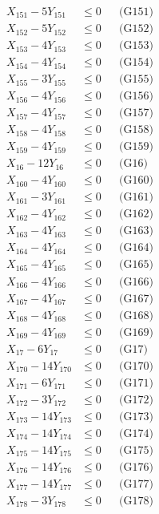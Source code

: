 \documentclass[a4paper,10pt]{article}
\begin{document}
{\begin{align}
X_{151} - 5Y_{151} &\leq 0 && \text{(G151)} \\
\allowbreak
X_{152} - 5Y_{152} &\leq 0 && \text{(G152)} \\
X_{153} - 4Y_{153} &\leq 0 && \text{(G153)} \\
X_{154} - 4Y_{154} &\leq 0 && \text{(G154)} \\
X_{155} - 3Y_{155} &\leq 0 && \text{(G155)} \\
X_{156} - 4Y_{156} &\leq 0 && \text{(G156)} \\
X_{157} - 4Y_{157} &\leq 0 && \text{(G157)} \\
X_{158} - 4Y_{158} &\leq 0 && \text{(G158)} \\
X_{159} - 4Y_{159} &\leq 0 && \text{(G159)} \\
X_{16} - 12Y_{16} &\leq 0 && \text{(G16)} \\
X_{160} - 4Y_{160} &\leq 0 && \text{(G160)} \\
X_{161} - 3Y_{161} &\leq 0 && \text{(G161)} \\
X_{162} - 4Y_{162} &\leq 0 && \text{(G162)} \\
X_{163} - 4Y_{163} &\leq 0 && \text{(G163)} \\
X_{164} - 4Y_{164} &\leq 0 && \text{(G164)} \\
X_{165} - 4Y_{165} &\leq 0 && \text{(G165)} \\
X_{166} - 4Y_{166} &\leq 0 && \text{(G166)} \\
X_{167} - 4Y_{167} &\leq 0 && \text{(G167)} \\
X_{168} - 4Y_{168} &\leq 0 && \text{(G168)} \\
X_{169} - 4Y_{169} &\leq 0 && \text{(G169)} \\
X_{17} - 6Y_{17} &\leq 0 && \text{(G17)} \\
\allowbreak
X_{170} - 14Y_{170} &\leq 0 && \text{(G170)} \\
X_{171} - 6Y_{171} &\leq 0 && \text{(G171)} \\
X_{172} - 3Y_{172} &\leq 0 && \text{(G172)} \\
X_{173} - 14Y_{173} &\leq 0 && \text{(G173)} \\
X_{174} - 14Y_{174} &\leq 0 && \text{(G174)} \\
X_{175} - 14Y_{175} &\leq 0 && \text{(G175)} \\
X_{176} - 14Y_{176} &\leq 0 && \text{(G176)} \\
X_{177} - 14Y_{177} &\leq 0 && \text{(G177)} \\
X_{178} - 3Y_{178} &\leq 0 && \text{(G178)} \\

\end{align}}
\end{document}
